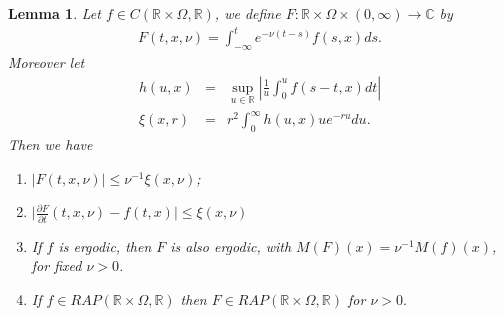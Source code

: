 \documentclass[english,reqno]{amsart}
\numberwithin{equation}{section}
\theoremstyle{plain}
\newtheorem{lem}[thm]{Lemma}
\theoremstyle{definition}
\theoremstyle{remark}
\newcommand{\bb}[1]{{\mathbb{#1}}}
\begin{document}
\begin{lem}\label{lema_tecnico_desigualdad}
Let $f\in C(\bb{R}\times\Omega,\bb{R})$, we define $F:\bb{R}\times\Omega\times (0,\infty)\rightarrow \bb{C}$ by
\begin{eqnarray}
F(t,x,\nu)=\int_{-\infty}^{t} e^{-\nu(t-s)}f(s,x)ds.\label{F_exp_nu}
\end{eqnarray}
Moreover let
\begin{eqnarray}
h(u,x)&=&\sup_{u\in\bb{R}}\left\vert \frac{1}{u}\int_{0}^{u}f(s-t,x)dt \right\vert \label{h_ux}\\
\xi(x,r)&=&r^{2}\int_{0}^{\infty} h(u,x) ue^{-ru}du.\label{xi_xr}
\end{eqnarray}
Then we have
\begin{enumerate}
\item $\vert F(t,x,\nu)\vert\leq \nu^{-1}\xi(x,\nu)$;

\item  $\vert \frac{\partial F}{\partial t}(t,x,\nu)-f(t,x)\vert\leq \xi(x,\nu)$

\item If $f$ is ergodic, then $F$ is also ergodic, with $M(F)(x)=\nu^{-1}M(f)(x)$, for fixed $\nu>0$.

\item If $f\in RAP(\bb{R}\times\Omega,\bb{R})$ then $F\in RAP(\bb{R}\times\Omega,\bb{R})$ for $\nu>0.$
\end{enumerate}
\end{lem}
\end{document}
